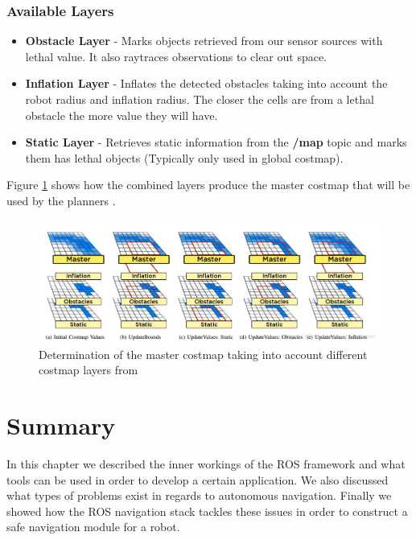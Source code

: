 \subsubsection*{Available Layers}
\begin{itemize}
    \item \textbf{Obstacle Layer} - Marks objects retrieved from our sensor sources with lethal value. It also raytraces observations to clear out space.
    \item \textbf{Inflation Layer} - Inflates the detected obstacles taking into account the robot radius and inflation radius. The closer the cells are from a lethal obstacle the more value they will have.
    \item \textbf{Static Layer} - Retrieves static information from the \textbf{/map} topic and marks them has lethal objects (Typically only used in global costmap).
\end{itemize}

Figure \ref{fig:layers1} shows how the combined layers produce the master costmap that will be used by the planners \cite{lu2014layered}.

\begin{figure}[!htb]
    \centering
    \includegraphics[width=\linewidth]{imgs/chapter3/layers1.png}
    \caption[Determination of the master costmap taking into account different costmap layers]{Determination of the master costmap taking into account different costmap layers from \cite{lu2014layered}}
    \label{fig:layers1}
\end{figure}
\section{Summary}
In this chapter we described the inner workings of the ROS framework and what tools can be used in order to develop a certain application. We also discussed what types of problems exist in regards to autonomous navigation. Finally we showed how the ROS navigation stack tackles these issues in order to construct a safe navigation module for a robot.


